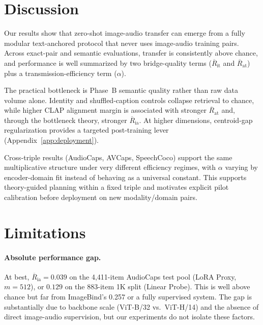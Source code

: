 \documentclass{article}
\newcommand{\avgR}{\overline{R}}
\begin{document}
\section{Discussion}
\label{sec:discussion}

Our results show that zero-shot image-audio transfer can emerge from a fully modular text-anchored protocol that never uses image-audio training pairs.
Across exact-pair and semantic evaluations, transfer is consistently above chance, and performance is well summarized by two bridge-quality terms ($\avgR_\mathrm{it}$ and $\avgR_\mathrm{at}$) plus a transmission-efficiency term ($\alpha$).

The practical bottleneck is Phase~B semantic quality rather than raw data volume alone.
Identity and shuffled-caption controls collapse retrieval to chance, while higher CLAP alignment margin is associated with stronger $\avgR_\mathrm{at}$ and, through the bottleneck theory, stronger $\avgR_\mathrm{ia}$.
At higher dimensions, centroid-gap regularization provides a targeted post-training lever (Appendix~\ref{app:deployment}).

Cross-triple results (AudioCaps, AVCaps, SpeechCoco) support the same multiplicative structure under very different efficiency regimes, with $\alpha$ varying by encoder-domain fit instead of behaving as a universal constant.
This supports theory-guided planning within a fixed triple and motivates explicit pilot calibration before deployment on new modality/domain pairs.

\section{Limitations}
\label{sec:limitations}

\paragraph{Absolute performance gap.}
At best, $\avgR_\mathrm{ia} = 0.039$ on the 4,411-item AudioCaps test pool (LoRA Proxy, $m=512$), or $0.129$ on the 883-item 1K split (Linear Probe).
This is well above chance but far from ImageBind's 0.257 or a fully supervised system.
The gap is substantially due to backbone scale (ViT-B/32 vs.\ ViT-H/14) and the absence of direct image-audio supervision, but our experiments do not isolate these factors.
\end{document}
